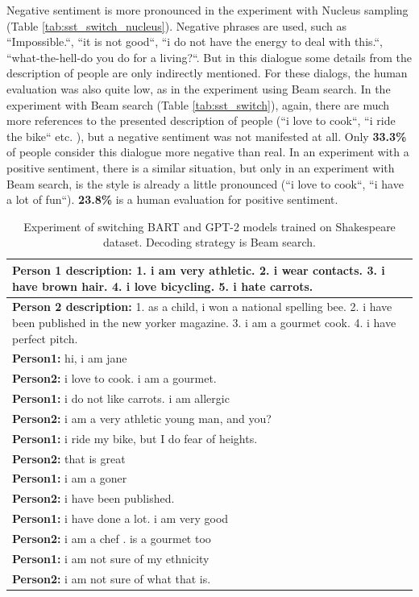Negative sentiment is more pronounced in the experiment with Nucleus sampling (Table \ref{tab:sst_switch_nucleus}). Negative phrases are used, such as ``Impossible.``, ``it is not good``, ``i do not have the energy to deal with this.``, ``what-the-hell-do you do for a living?``. But in this dialogue some details from the description of people are only indirectly mentioned. For these dialogs, the human evaluation was also quite low, as in the experiment using Beam search. In the experiment with Beam search (Table \ref{tab:sst_switch}), again, there are much more references to the presented description of people (``i love to cook``, ``i ride the bike`` etc. ), but a negative sentiment was not manifested at all. Only \textbf{33.3\%} of people consider this dialogue more negative than real. In an experiment with a positive sentiment, there is a similar situation, but only in an experiment with Beam search, is the style is already a little pronounced (``i love to cook``, ``i have a lot of fun``). \textbf{23.8\%} is a human evaluation for positive sentiment.

\begin{table}[H]
\centering
 \begin{tabular}{|p{14cm}|} 
 \hline
 \textbf{Person 1 description:} 1. i am very athletic. 2. i wear contacts. 3. i have brown hair. 4. i love bicycling. 5. i hate carrots. \\
 \hline
 \textbf{Person 2 description:} 1. as a child, i won a national spelling bee. 2. i have been published in the new yorker magazine. 3. i am a gourmet cook. 4. i have perfect pitch. \\
 \hline
 \textbf{Person1:} hi, i am jane  \\
 \textbf{Person2:} i love to cook. i am a gourmet. \\ 
 \textbf{Person1:} i do not like carrots. i am allergic \\
 \textbf{Person2:} i am a very athletic young man, and you?\\
 \textbf{Person1:} i ride my bike, but I do fear of heights. \\
 \textbf{Person2:} that is great \\
 \textbf{Person1:} i am a goner  \\
 \textbf{Person2:} i have been published.\\
 \textbf{Person1:} i have done a lot. i am very good  \\
 \textbf{Person2:} i am a chef . is a gourmet too \\
 \textbf{Person1:} i am not sure of my ethnicity \\
 \textbf{Person2:} i am not sure of what that is. \\
 \hline
 \end{tabular}
 \caption{Experiment of switching BART and GPT-2 models trained on Shakespeare dataset. Decoding strategy is Beam search.}
\label{tab:shakespeare_switch}
\end{table}

